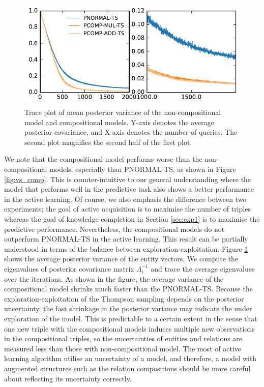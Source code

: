 \begin{figure}[t]
	\centering

	
	\includegraphics[width=0.9\linewidth]{images/posterior_variance_trace_kinship.pdf}

	\caption{\label{fig:pos_var} Trace plot of mean posterior variance of the non-compositional model and compositional models. Y-axis denotes the average posterior covariance, and X-axis denotes the number of queries. The second plot magnifies the second half of the first plot.}
\end{figure}

We note that the compositional model performs worse than the non-compositional models,
especially than PNORMAL-TS, as shown in Figure \ref{fig:vs_comp}.
This is counter-intuitive to our general understanding where
the model that performs well in the predictive task also shows 
a better performance in the active learning. 
Of course, we also emphasis the difference between two experiments; 
the goal of active acquisition is to maximise the number of triples 
whereas the goal of knowledge completion in Section \ref{sec:exp1} is to maximise 
the predictive performance. Nevertheless, the compositional models do not outperform 
PNORMAL-TS in the active learning.
This result can be partially understood in terms of the balance between 
exploration-exploitation. Figure \ref{fig:pos_var} shows the average posterior variance of 
the entity vectors. We compute the eigenvalues of posterior covariance matrix $\Lambda_i^{-1}$ 
and trace the average eigenvalues over the iterations. 
As shown in the figure, the average variance of the compositional model shrinks much faster 
than the PNORMAL-TS. Because the exploration-exploitation of the Thompson sampling depends on the
posterior uncertainty, the fast shrinkage in the posterior variance may indicate the under 
exploration of the model. This is predictable to a certain extent in the sense that one new triple with the compositional models induces multiple new 
observations in the compositional triples, so the uncertainties of entities and 
relations are measured less than those with non-compositional model. The most of active 
learning algorithm utilise an uncertainty of a model, and therefore, a model with augmented 
structures such as the relation compositions should be more careful about reflecting its uncertainty correctly.

